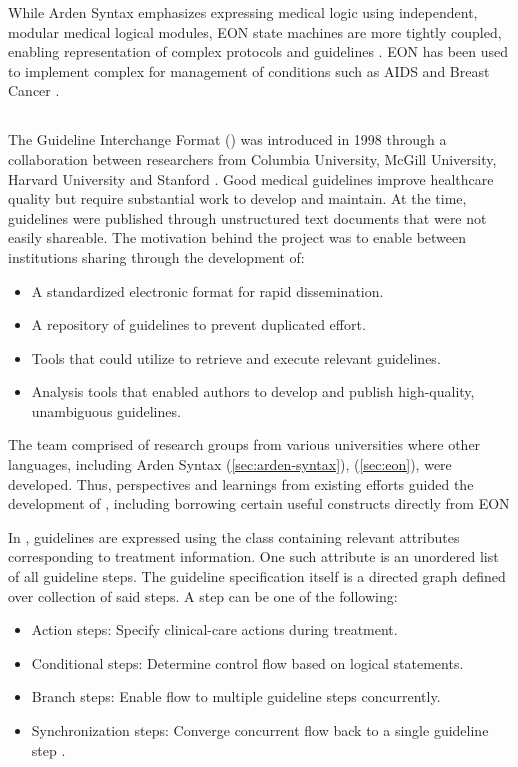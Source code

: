 While Arden Syntax emphasizes expressing medical logic using independent, modular
medical logical modules, EON state machines are more tightly coupled, enabling
representation of complex protocols and guidelines \cite{TuAMIA96}. EON has
been used to implement complex \CDSSs{} for management of conditions such as
AIDS \cite{MusenJAMIA96} and Breast Cancer \cite{TuAMIA96}.

\subsection{\GLIF{}}\label{sec:glif}

The Guideline Interchange Format (\GLIF{}) was introduced in 1998 through
a collaboration between researchers from Columbia University,
McGill University, Harvard University and Stanford \cite{ClerqAIM03}. Good medical
guidelines improve healthcare quality but require substantial work
to develop and maintain. At the time, guidelines were published through
unstructured text documents that were not easily shareable. The motivation
behind the \GLIF{} project was to enable \BPG{} between institutions sharing
through the development of:
\begin{itemize}
  \item A standardized electronic format for rapid dissemination.
  \item A repository of guidelines to prevent duplicated effort.
  \item Tools that \HCPs{} could utilize to retrieve and
    execute relevant guidelines.
  \item Analysis tools that enabled authors to develop
    and publish high-quality, unambiguous guidelines.
\end{itemize}

The \GLIF{} team comprised of research groups from various universities
where other languages, including Arden Syntax (\autoref{sec:arden-syntax}),
\GEODECM{} (\autoref{sec:eon}),
were developed. Thus, perspectives and learnings from existing efforts guided
the development of \GLIF{}, including borrowing certain useful constructs
directly from EON \cite{MachadoJAMIA98}

In \GLIF{}, guidelines are expressed using the \GLIF{} class containing
relevant attributes corresponding to treatment information. One such
attribute is an unordered list of all guideline steps. The guideline
specification itself is a directed graph defined over collection of
said steps. A step can be one of the following:
\begin{itemize}
    \item Action steps: Specify clinical-care actions during treatment.
    \item Conditional steps: Determine control flow based on logical statements.
    \item Branch steps: Enable flow to multiple guideline steps concurrently.
    \item Synchronization steps: Converge concurrent flow back to a single
      guideline step \cite{MachadoJAMIA98}.
\end{itemize}

